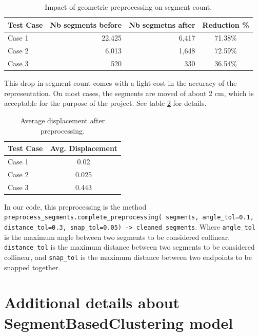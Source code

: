 \documentclass[11pt]{article}
\begin{document}
\begin{table}[htb!]
    \centering
    \begin{tabular}{|l|rrc|}
        \hline
        \textbf{Test Case} & \textbf{Nb segments before} & \textbf{Nb segmetns after} & \textbf{Reduction \%} \\
        \hline

        Case 1 & 22,425 & 6,417 & 71.38\% \\
        Case 2 & 6,013 & 1,648 & 72.59\% \\
        Case 3 & 520 & 330 & 36.54\% \\
        \hline
    \end{tabular}
    \caption{Impact of geometric preprocessing on segment count.}
    \label{tab:segment_count}
\end{table}

This drop in segment count comes with a light cost in the accuracy of the representation.
On most cases, the segments are moved of about 2 cm, which is acceptable for the
purpose of the project. See table \ref{tab:avg_displacement} for details.

\begin{table}[htb!]
    \centering
    \begin{tabular}{|l|c|}
        \hline

        \textbf{Test Case} & \textbf{Avg. Displacement} \\
        \hline
        Case 1 & 0.02 \\
        Case 2 & 0.025 \\
        Case 3 & 0.443 \\
        \hline

    \end{tabular}
    \caption{Average displacement after preprocessing.}
    \label{tab:avg_displacement}
\end{table}

In our code, this preprocessing is the method 
\texttt{preprocess\_segments.complete\_preprocessing(
    segments, angle\_tol=0.1, distance\_tol=0.3, snap\_tol=0.05) -> cleaned\_segments}.
    Where \texttt{angle\_tol} is the maximum angle between two segments to be considered collinear,
    \texttt{distance\_tol} is the maximum distance between two segments to be considered collinear,
    and \texttt{snap\_tol} is the maximum distance between two endpoints to be snapped together.


\section{Additional details about SegmentBasedClustering model}
\label{app:sec:SBCdetails}
\end{document}
